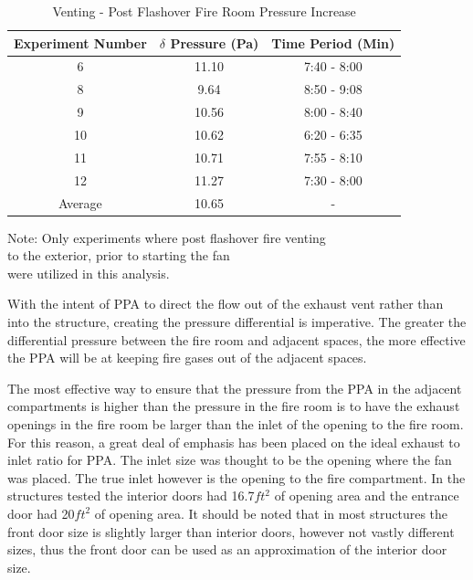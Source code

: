 \documentclass{article}
\begin{document}
\begin{table} [H]
	\centering
	\caption{Venting - Post Flashover Fire Room Pressure Increase}
	\centering
	
	\begin{tabular}{|c|c|c|}
		\hline
		Experiment Number & $\delta$ Pressure (Pa) & Time Period (Min) \\ \hline \hline
		6 & 11.10 & 7:40 - 8:00 \\ \hline
		8 & 9.64 & 8:50 - 9:08 \\ \hline
		9 & 10.56 & 8:00 - 8:40 \\ \hline
		10 & 10.62 & 6:20 - 6:35 \\ \hline
		11 & 10.71 & 7:55 - 8:10 \\ \hline
		12 & 11.27 & 7:30 - 8:00 \\ \hline
		Average & 10.65 & -  \\ \hline
	\end{tabular}
	
	\begin{tablenotes}
		\centering
		\item Note: Only experiments where post flashover fire venting \\ to the exterior, prior to starting the fan \\ were utilized in this analysis.
	\end{tablenotes}
	\label{tab:FireRoomPressure}
\end{table}

With the intent of PPA to direct the flow out of the exhaust vent rather than into the structure, creating the pressure differential is imperative. The greater the differential pressure between the fire room and adjacent spaces, the more effective the PPA will be at keeping fire gases out of the adjacent spaces.

The most effective way to ensure that the pressure from the PPA in the adjacent compartments is higher than the pressure in the fire room is to have the exhaust openings in the fire room be larger than the inlet of the opening to the fire room.  For this reason, a great deal of emphasis has been placed on the ideal exhaust to inlet ratio for PPA. The inlet size was thought to be the opening where the fan was placed. The true inlet however is the opening to the fire compartment. In the structures tested the interior doors had 16.7$ft^2$ of opening area and the entrance door had 20$ft^2$ of opening area. It should be noted that in most structures the front door size is slightly larger than interior doors, however not vastly different sizes, thus the front door can be used as an approximation of the interior door size.
\end{document}
